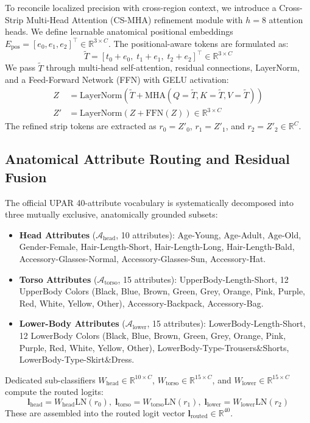 To reconcile localized precision with cross-region context, we introduce a Cross-Strip Multi-Head Attention (CS-MHA) refinement module with $h=8$ attention heads. We define learnable anatomical positional embeddings $E_{\mathrm{pos}} = [e_0, e_1, e_2]^\top \in \mathbb{R}^{3 \times C}$. The positional-aware tokens are formulated as:
\begin{equation}
    \tilde{T} = \left[ t_0 + e_0, \; t_1 + e_1, \; t_2 + e_2 \right]^\top \in \mathbb{R}^{3 \times C}
\end{equation}
We pass $\tilde{T}$ through multi-head self-attention, residual connections, LayerNorm, and a Feed-Forward Network (FFN) with GELU activation:
\begin{align}
    Z &= \mathrm{LayerNorm}\left(\tilde{T} + \mathrm{MHA}\left(Q=\tilde{T}, K=\tilde{T}, V=\tilde{T}\right)\right) \\
    Z' &= \mathrm{LayerNorm}\left(Z + \mathrm{FFN}(Z)\right) \in \mathbb{R}^{3 \times C}
\end{align}
The refined strip tokens are extracted as $r_0 = Z'_0$, $r_1 = Z'_1$, and $r_2 = Z'_2 \in \mathbb{R}^C$.

\subsection{Anatomical Attribute Routing and Residual Fusion}
The official UPAR 40-attribute vocabulary is systematically decomposed into three mutually exclusive, anatomically grounded subsets:
\begin{itemize}
    \item \textbf{Head Attributes} ($\mathcal{A}_{\mathrm{head}}$, 10 attributes): Age-Young, Age-Adult, Age-Old, Gender-Female, Hair-Length-Short, Hair-Length-Long, Hair-Length-Bald, Accessory-Glasses-Normal, Accessory-Glasses-Sun, Accessory-Hat.
    \item \textbf{Torso Attributes} ($\mathcal{A}_{\mathrm{torso}}$, 15 attributes): UpperBody-Length-Short, 12 UpperBody Colors (Black, Blue, Brown, Green, Grey, Orange, Pink, Purple, Red, White, Yellow, Other), Accessory-Backpack, Accessory-Bag.
    \item \textbf{Lower-Body Attributes} ($\mathcal{A}_{\mathrm{lower}}$, 15 attributes): LowerBody-Length-Short, 12 LowerBody Colors (Black, Blue, Brown, Green, Grey, Orange, Pink, Purple, Red, White, Yellow, Other), LowerBody-Type-Trousers\&Shorts, LowerBody-Type-Skirt\&Dress.
\end{itemize}

Dedicated sub-classifiers $W_{\mathrm{head}} \in \mathbb{R}^{10 \times C}$, $W_{\mathrm{torso}} \in \mathbb{R}^{15 \times C}$, and $W_{\mathrm{lower}} \in \mathbb{R}^{15 \times C}$ compute the routed logits:
\begin{equation}
    \mathbf{l}_{\mathrm{head}} = W_{\mathrm{head}} \mathrm{LN}(r_0), \;
    \mathbf{l}_{\mathrm{torso}} = W_{\mathrm{torso}} \mathrm{LN}(r_1), \;
    \mathbf{l}_{\mathrm{lower}} = W_{\mathrm{lower}} \mathrm{LN}(r_2)
\end{equation}
These are assembled into the routed logit vector $\mathbf{l}_{\mathrm{routed}} \in \mathbb{R}^{40}$. 


